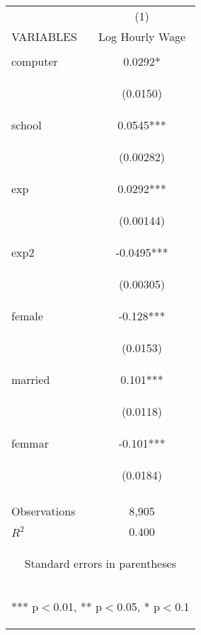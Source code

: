 \begin{center}
\begin{tabular}{lc} \hline
 & (1) \\
VARIABLES & Log Hourly Wage \\ \hline
\vspace{4pt} & \begin{footnotesize}\end{footnotesize} \\
computer & 0.0292* \\
\vspace{4pt} & \begin{footnotesize}(0.0150)\end{footnotesize} \\
school & 0.0545*** \\
\vspace{4pt} & \begin{footnotesize}(0.00282)\end{footnotesize} \\
exp & 0.0292*** \\
\vspace{4pt} & \begin{footnotesize}(0.00144)\end{footnotesize} \\
exp2 & -0.0495*** \\
\vspace{4pt} & \begin{footnotesize}(0.00305)\end{footnotesize} \\
female & -0.128*** \\
\vspace{4pt} & \begin{footnotesize}(0.0153)\end{footnotesize} \\
married & 0.101*** \\
\vspace{4pt} & \begin{footnotesize}(0.0118)\end{footnotesize} \\
femmar & -0.101*** \\
 & \begin{footnotesize}(0.0184)\end{footnotesize} \\
\vspace{4pt} & \begin{footnotesize}\end{footnotesize} \\
Observations & 8,905 \\
 $R^2$ & 0.400 \\ \hline
\multicolumn{2}{c}{\begin{footnotesize} Standard errors in parentheses\end{footnotesize}} \\
\multicolumn{2}{c}{\begin{footnotesize} *** p$<$0.01, ** p$<$0.05, * p$<$0.1\end{footnotesize}} \\
\end{tabular}
\end{center}
